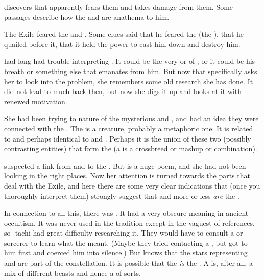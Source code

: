 \Urizeth discovers that \Ishnaruchaefir apparently fears them and takes damage from them.  
Some \WanderersInDarknessEmph passages describe how the \Zaz and \Urzaz are anathema to him.

The Exile feared the  and .
Some clues said that he feared the \malgryph (the ), that he quailed before it, that it held the power to cast him down and destroy him.

\Urizeth had long had trouble interpreting .
It could be the very  or  of \Urzaz, or it could be his breath or something else that emanates from him.
But now that \Teshrial specifically asks her to look into the problem, she remembers some old research she has done.
It did not lead to much back then, but now she digs it up and looks at it with renewed motivation.

She had been trying to nature of the mysterious \Zaz and \Urzaz, and had an idea they were connected with the \quo{\Chimaera}.
The \Chimaera is a creature, probably a metaphoric one. 
It is related to and perhaps identical to \Zaz and \Urzaz.
Perhaps it is the union of these two (possibly contrasting entities) that form the \Chimaera (a \chimaera is a crossbreed or mashup or combination). 

\Urizeth suspected a link from \Zaz and \Urzaz to the \Chimaera. 
But \WanderersInDarknessEmph is a huge poem, and she had not been looking in the right places.
Now her attention is turned towards the parts that deal with the Exile, and here there are some very clear indications that (once you thoroughly interpret them) strongly suggest that \Zaz and \Urzaz more or less \emph{are} the \Chimaera.

In connection to all this, there was .
It had a very obscure meaning in ancient \draconian occultism.
It was never used in the \rethyactic tradition except in the vaguest of references, so \Urizeth-tachi had great difficulty researching it. 
They would have to consult a \dragon or \quiljaar sorcerer to learn what the \Malgryph meant.
(Maybe they tried contacting a \quiljaar, but \Ishnaruchaefir got to him first and coerced him into silence.)
But \Urizeth knows that the stars representing \Zaz and \Urzaz are part of the \Malgryph constellation.
It is possible that the \Malgryph \emph{is} the \quo{\Chimaera}.
A \malgryph is, after all, a mix of different beasts and hence a \chimaera of sorts.






